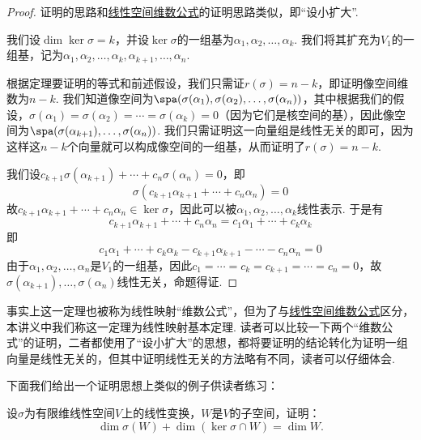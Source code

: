 \begin{proof}
    证明的思路和\hyperref[thm:4:维数公式]{线性空间维数公式}的证明思路类似，即``设小扩大''.

    我们设$\dim\ker\sigma=k$，并设$\ker\sigma$的一组基为$\alpha_1,\alpha_2,\ldots,\alpha_k$. 我们将其扩充为$V_1$的一组基，记为$\alpha_1,\alpha_2,\ldots,\alpha_k,\alpha_{k+1},\ldots,\alpha_n$.

    根据定理要证明的等式和前述假设，我们只需证$r(\sigma)=n-k$，即证明像空间维数为$n-k$. 我们知道像空间为$\spa(\sigma(\alpha_1),\sigma(\alpha_2),\ldots,\sigma(\alpha_n))$，其中根据我们的假设，$\sigma(\alpha_1)=\sigma(\alpha_2)=\cdots=\sigma(\alpha_k)=0$（因为它们是核空间的基），因此像空间为$\spa(\sigma(\alpha_{k+1}),\ldots,\sigma(\alpha_n))$. 我们只需证明这一向量组是线性无关的即可，因为这样这$n-k$个向量就可以构成像空间的一组基，从而证明了$r(\sigma)=n-k$.

    我们设$c_{k+1}\sigma(\alpha_{k+1})+\cdots+c_n\sigma(\alpha_n)=0$，即
    \[\sigma(c_{k+1}\alpha_{k+1}+\cdots+c_n\alpha_n)=0\]
    故$c_{k+1}\alpha_{k+1}+\cdots+c_n\alpha_n \in \ker\sigma$，因此可以被$\alpha_1,\alpha_2,\ldots,\alpha_k$线性表示. 于是有
    \[c_{k+1}\alpha_{k+1}+\cdots+c_n\alpha_n=c_1\alpha_1+\cdots+c_k\alpha_k\]
    即
    \[c_1\alpha_1+\cdots+c_k\alpha_k-c_{k+1}\alpha_{k+1}-\cdots-c_n\alpha_n=0\]
    由于$\alpha_1,\alpha_2,\ldots,\alpha_n$是$V_1$的一组基，因此$c_1=\cdots=c_k=c_{k+1}=\cdots=c_n=0$，故$\sigma(\alpha_{k+1}),\ldots,\sigma(\alpha_n)$线性无关，命题得证.
\end{proof}

事实上这一定理也被称为线性映射``维数公式''，但为了与\hyperref[thm:4:维数公式]{线性空间维数公式}区分，本讲义中我们称这一定理为线性映射基本定理. 读者可以比较一下两个``维数公式''的证明，二者都使用了``设小扩大''的思想，都将要证明的结论转化为证明一组向量是线性无关的，但其中证明线性无关的方法略有不同，读者可以仔细体会.

下面我们给出一个证明思想上类似的例子供读者练习：
\begin{example}
    设$\sigma$为有限维线性空间$V$上的线性变换，$W$是$V$的子空间，证明：
    \[\dim\sigma(W)+\dim(\ker\sigma \cap W)=\dim W.\]
\end{example}

